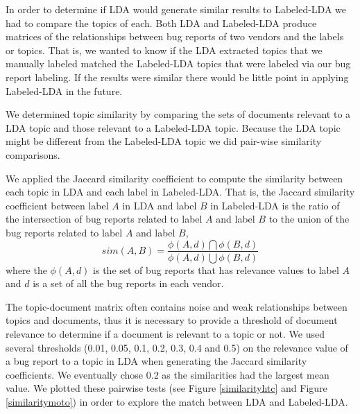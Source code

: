 \documentclass[10pt, conference, compsocconf]{IEEEtran}
\begin{document}

In order to determine if LDA would generate similar results to
Labeled-LDA we had to compare the topics of each.
Both LDA and Labeled-LDA produce matrices of
 the relationships between bug reports of two vendors and the
labels or topics.
That is, we wanted to know if the LDA extracted topics that we manually
labeled matched the Labeled-LDA topics that were labeled via our bug
report labeling. If the results were similar there would be little
point in applying Labeled-LDA in the future.

We determined topic similarity by comparing the sets of documents
relevant to a LDA topic and those relevant to a Labeled-LDA
topic. Because the LDA topic might be different from the Labeled-LDA
topic we did pair-wise similarity comparisons.

We applied the Jaccard similarity coefficient to compute the
similarity between each topic in LDA and each label in Labeled-LDA. 
That is, the Jaccard similarity coefficient between label $A$ in LDA and
label $B$ in Labeled-LDA is the ratio of the intersection of bug reports
related to label $A$ and label $B$ to the union of the bug reports related
to label $A$ and label $B$,
\begin{equation}
sim(A,B) = \frac{\phi(A,d)\bigcap\phi(B,d)}{\phi(A,d)\bigcup\phi(B,d)}
\end{equation}
where the $\phi(A,d)$ is the set of bug reports that has relevance
values to label $A$ and $d$ is a set of all the bug reports in each
vendor.

The topic-document matrix often contains noise and weak
relationships between topics and documents, thus it is necessary to
provide a threshold of document relevance to determine if a document
is relevant to a topic or not.
We used several thresholds (0.01, 0.05, 0.1, 0.2, 0.3, 0.4 and 0.5) on
the relevance value of a bug report to a topic in LDA when generating
the Jaccard similarity coefficients. 
We eventually chose $0.2$ as the similarities had the largest mean
value. 
We plotted these pairwise tests (see Figure \ref{similarityhtc} and
Figure \ref{similaritymoto}) in order to explore the match between
LDA and Labeled-LDA.
\end{document}
